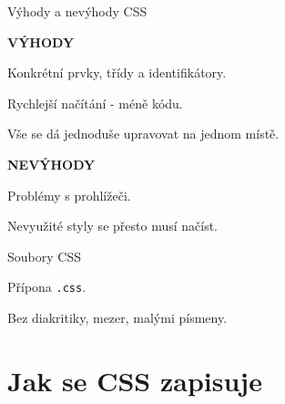 \documentclass[aspectratio=1610]{beamer}
\begin{document}
\begin{frame}{Výhody a nevýhody CSS}
    \begin{multicols}{2}
        \centering

        \begin{cardTiny}
            \begin{center}
                \textbf{VÝHODY}
            \end{center}

            \begin{flushleft}
            Konkrétní prvky, třídy a identifikátory.

            Rychlejší načítání - méně kódu.

            Vše se dá jednoduše upravovat na jednom místě.
            \end{flushleft}
        \end{cardTiny}

        \begin{cardTiny}
            \begin{center}
                \textbf{NEVÝHODY}
            \end{center}
        
            Problémy s prohlížeči.

            Nevyužité styly se přesto musí načíst.
        \end{cardTiny}
    \end{multicols}
\end{frame}

\begin{frame}{Soubory CSS}
    \begin{cardTiny}
        Přípona \texttt{.css}.

        Bez diakritiky, mezer, malými písmeny.
    \end{cardTiny}
\end{frame}



\section{Jak se CSS zapisuje}
\end{document}
